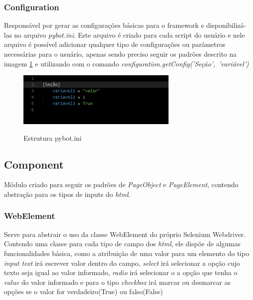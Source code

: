             \subsubsection{Configuration}
            Responsável por gerar as configurações básicas para o framework e disponibilizá-las no arquivo \emph{pybot.ini}.
            Este arquivo é criado para cada script do usuário e nele arquivo é possível adicionar qualquer tipo de configurações ou parâmetros
            necessárias para o usuário, apenas sendo preciso seguir os padrões descrito na imagem \ref{fig:pybot.ini} e utilizando com o comando
            \mbox{\emph{configuration.getConfig('Seção', 'variável')}}

            \begin{figure}[H]
                \vspace*{0,3cm}
                \centering
                \caption{Estrutura pybot.ini}
                \includegraphics[width=0.7\textwidth]{./04-figuras/ini}
                \label{fig:pybot.ini}
            \end{figure}

        \subsection{Component}
        \label{Comp}
            Módulo criado para seguir os padrões de \emph{PageObject} e \emph{PageElement}, contendo abstração para os tipos de inputs do \emph{html}.

            \subsubsection{WebElement}
                Serve para abstrair o uso da classe WebElement do próprio Selenium Webdriver. Contendo uma classe para cada tipo de campo dos \emph{html},
                ele dispõe de algumas funcionalidades básica, como a atribuição de uma valor para um elemento do tipo \emph{input text} irá escrever
                valor dentro do campo, \emph{select} irá selecionar a opção cujo texto seja igual ao valor informado, \emph{radio} irá selecionar o
                a opção que tenha o \emph{value} do valor informado e para o tipo \emph{checkbox} irá marcar ou desmarcar as opções se o valor for
                verdadeiro(True) ou falso(False)

